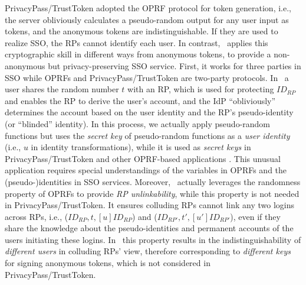 PrivacyPass/TrustToken adopted the OPRF protocol for token generation, i.e., the server obliviously calculates a pseudo-random output for any user input as tokens,
and the anonymous tokens are indistinguishable.
If they are used to realize SSO, the RPs cannot identify each user.
In contrast, \usso\ applies this cryptographic skill in different ways from anonymous tokens,
 to provide a non-anonymous but privacy-preserving SSO service.
First, it works for three parties in SSO while OPRFs and PrivacyPass/TrustToken are two-party protocols.
In \usso\ a user shares the random number $t$ with an RP, which is used for protecting $ID_{RP}$ and enables the RP to derive the user's account, %
    and the IdP ``obliviously'' determines the account based on the user identity and the RP's pseudo-identity (or ``blinded'' identity).
In this process, we actually apply pseudo-random functions but uses the \emph{secret key} of pseudo-random functions as a \emph{user identity} (i.e., $u$ in identity transformations),
    while it is used as \emph{secret keys} in PrivacyPass/TrustToken and other OPRF-based applications \cite{privacypass,trusttoken,strong-oprf,oprf-bitcoin-wallet,pesto,oprf-ot-si,pp-ss,Private-Contact-Discovery,o-kms,oprf-deduplication}.
This unusual application requires special understandings of the variables in OPRFs and the (pseudo-)identities in SSO services.
Moreover, \usso\ actually leverages the randomness property of OPRFs
 to provide \emph{RP unlinkability}, while this property is not needed in PrivacyPass/TrustToken.
It ensures colluding RPs cannot link any two logins across RPs, i.e., ($ID_{RP}, t, [u]ID_{RP}$) and ($ID_{RP'}, t', [u']ID_{RP'}$),
  even if they share the knowledge about the pseudo-identities and permanent accounts of the users initiating these logins.
In \usso\ this property results in the indistinguishability of \emph{different users} in colluding RPs' view,
    therefore corresponding to \emph{different keys} for signing anonymous tokens,
    which is not considered in PrivacyPass/TrustToken.

